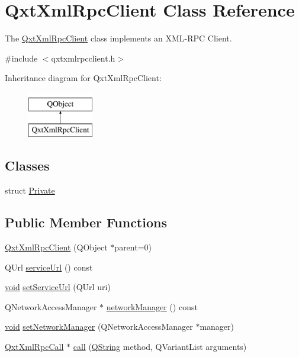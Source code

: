 \hypertarget{class_qxt_xml_rpc_client}{\section{Qxt\-Xml\-Rpc\-Client Class Reference}
\label{class_qxt_xml_rpc_client}
}


The \hyperlink{class_qxt_xml_rpc_client}{Qxt\-Xml\-Rpc\-Client} class implements an X\-M\-L-\/\-R\-P\-C Client.  




{\ttfamily \#include $<$qxtxmlrpcclient.\-h$>$}

Inheritance diagram for Qxt\-Xml\-Rpc\-Client\-:\begin{figure}[H]
\begin{center}
\leavevmode
\includegraphics[height=2.000000cm]{class_qxt_xml_rpc_client}
\end{center}
\end{figure}
\subsection*{Classes}
\begin{DoxyCompactItemize}
\item 
struct \hyperlink{struct_qxt_xml_rpc_client_1_1_private}{Private}
\end{DoxyCompactItemize}
\subsection*{Public Member Functions}
\begin{DoxyCompactItemize}
\item 
\hyperlink{class_qxt_xml_rpc_client_a6b4f8b03365ad0abed4109b9d41ea094}{Qxt\-Xml\-Rpc\-Client} (Q\-Object $\ast$parent=0)
\item 
Q\-Url \hyperlink{class_qxt_xml_rpc_client_a6eba961ddb287c16f1225aa3f786e863}{service\-Url} () const 
\item 
\hyperlink{group___u_a_v_objects_plugin_ga444cf2ff3f0ecbe028adce838d373f5c}{void} \hyperlink{class_qxt_xml_rpc_client_aa3f85cb8b12526a3245751ca3fb03413}{set\-Service\-Url} (Q\-Url uri)
\item 
Q\-Network\-Access\-Manager $\ast$ \hyperlink{class_qxt_xml_rpc_client_a07888a164af0cc54690b01ff21617003}{network\-Manager} () const 
\item 
\hyperlink{group___u_a_v_objects_plugin_ga444cf2ff3f0ecbe028adce838d373f5c}{void} \hyperlink{class_qxt_xml_rpc_client_ac3228ced40e14cca2f5eae1621814c9d}{set\-Network\-Manager} (Q\-Network\-Access\-Manager $\ast$manager)
\item 
\hyperlink{class_qxt_xml_rpc_call}{Qxt\-Xml\-Rpc\-Call} $\ast$ \hyperlink{class_qxt_xml_rpc_client_a9731337db0db2de3df32a8f77ff988f1}{call} (\hyperlink{group___u_a_v_objects_plugin_gab9d252f49c333c94a72f97ce3105a32d}{Q\-String} method, Q\-Variant\-List arguments)
\end{DoxyCompactItemize}


